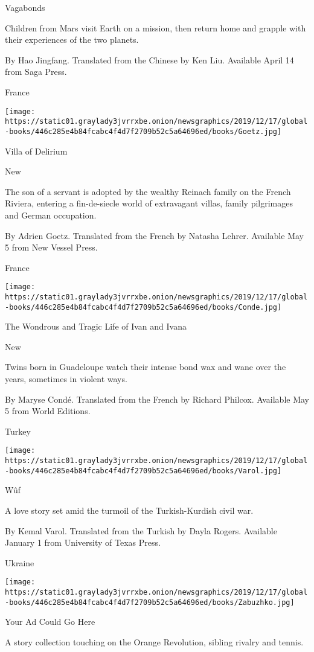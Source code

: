 Vagabonds

Children from Mars visit Earth on a mission, then return home and
grapple with their experiences of the two planets.

 By Hao Jingfang. Translated from the Chinese by Ken Liu. Available
April 14 from Saga Press.

France

\texttt{[image: https://static01.graylady3jvrrxbe.onion/newsgraphics/2019/12/17/global-books/446c285e4b84fcabc4f4d7f2709b52c5a64696ed/books/Goetz.jpg]}

Villa of Delirium

New

The son of a servant is adopted by the wealthy Reinach family on the
French Riviera, entering a fin-de-siecle world of extravagant villas,
family pilgrimages and German occupation.

 By Adrien Goetz. Translated from the French by Natasha Lehrer.
Available May 5 from New Vessel Press.

France

\texttt{[image: https://static01.graylady3jvrrxbe.onion/newsgraphics/2019/12/17/global-books/446c285e4b84fcabc4f4d7f2709b52c5a64696ed/books/Conde.jpg]}

The Wondrous and Tragic Life of Ivan and Ivana

New

Twins born in Guadeloupe watch their intense bond wax and wane over the
years, sometimes in violent ways.

 By Maryse Condé. Translated from the French by Richard Philcox.
Available May 5 from World Editions.

Turkey

\texttt{[image: https://static01.graylady3jvrrxbe.onion/newsgraphics/2019/12/17/global-books/446c285e4b84fcabc4f4d7f2709b52c5a64696ed/books/Varol.jpg]}

Wûf

A love story set amid the turmoil of the Turkish-Kurdish civil war.

 By Kemal Varol. Translated from the Turkish by Dayla Rogers. Available
January 1 from University of Texas Press.

Ukraine

\texttt{[image: https://static01.graylady3jvrrxbe.onion/newsgraphics/2019/12/17/global-books/446c285e4b84fcabc4f4d7f2709b52c5a64696ed/books/Zabuzhko.jpg]}

Your Ad Could Go Here

A story collection touching on the Orange Revolution, sibling rivalry
and tennis.

